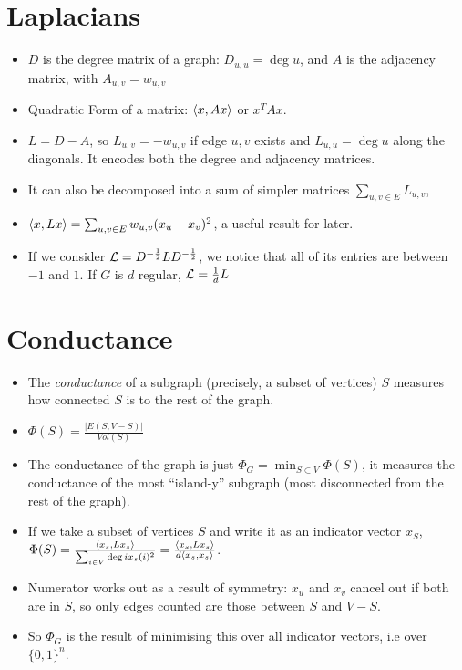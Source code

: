 \documentclass[11pt]{article}
\begin{document}
\section{Laplacians}
\label{sec:orgb93d19c}
\begin{itemize}
\item \(D\) is the degree matrix of a graph: \(D_{u,u}= \deg u\), and \(A\) is the adjacency matrix, with \(A_{u,v}=w_{u,v}\)
\item Quadratic Form of a matrix: \(\langle x , Ax \rangle\) or \(x^TAx\).
\item \(L=D-A\), so \(L_{u,v}=-w_{u,v}\) if edge \(u,v\) exists and \(L_{u,u}=\deg u\)  along the diagonals. It encodes both the degree and adjacency matrices.
\item It can also be decomposed into a sum of simpler matrices  \(\sum_{u,v \in E}L_{u,v}\),
\item \(\langle x , Lx \rangle=\sum_{u,v \in E} w_{u,v}(x_u-x_v)^2\), a useful result for later.
\item If we consider \(\mathcal{L} = D^{-\frac12}LD^{-\frac12}\), we notice that all of its entries are between \(-1\) and \(1\). If \(G\) is \(d\) regular, \(\mathcal{L}=\frac{1}{d}L\)
\end{itemize}
\section{Conductance}
\label{sec:org218eb03}
\begin{itemize}
\item The \emph{conductance} of a subgraph (precisely, a subset of vertices) \(S\) measures how connected \(S\) is to the rest of the graph.
\item \(\Phi(S)=\frac{|E(S,V-S)|}{Vol(S)}\)
\item The conductance of the graph  is just \(\Phi_G=\min_{S \subset V} \Phi(S)\), it measures the conductance of the most ``island-y'' subgraph (most disconnected from the rest of the graph).
\item If we take a subset of vertices \(S\) and write it as an indicator vector \(x_S\), \(\Phi(S)=\frac{\langle x_s , Lx_s \rangle}{\sum_{i \in V}\deg i x_s(i)^2}= \frac{\langle x_s , Lx_s \rangle}{d \langle x_s , x_s \rangle}\).
\end{itemize}

\begin{itemize}
\item Numerator works out as a result of symmetry: \(x_u\) and \(x_v\) cancel out if both are in \(S\), so only edges counted are those between \(S\) and \(V-S\).
\item So \(\Phi_G\) is the result of minimising this over all indicator vectors, i.e over \(\{0,1\}^n\).
\end{itemize}
\end{document}
